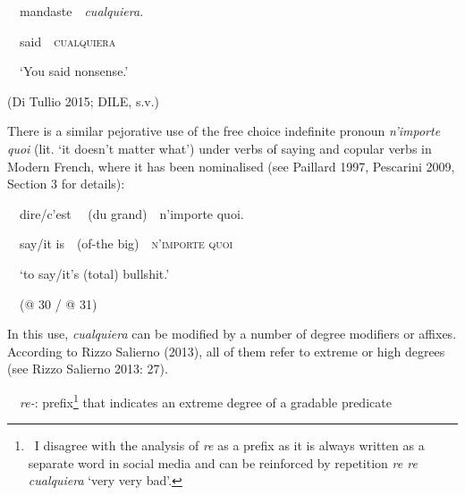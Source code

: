 \begin{styleStandard}
\ \ mandaste\ \ \textit{cualquiera}.\ \ 
\end{styleStandard}

\begin{styleStandard}
\ \ said\ \ \textsc{cualquiera}\ \ 
\end{styleStandard}

\begin{styleStandard}
\ \ ‘You said nonsense.’
\end{styleStandard}

\begin{styleStandard}
(Di Tullio 2015; DILE, s.v.)
\end{styleStandard}

\begin{styleStandard}
There is a similar pejorative use of the free choice indefinite pronoun \textit{n’importe quoi }(lit. ‘it doesn’t matter what’)\textit{ }under verbs of saying and copular verbs in Modern French, where it has been nominalised (see Paillard 1997, Pescarini 2009, Section 3 for details):
\end{styleStandard}

\begin{styleStandard}
\ \ dire/c’est \ \ (du grand)\ \ n’importe quoi.
\end{styleStandard}

\begin{styleStandard}
\ \ say/it is\ \ (of-the big)\ \ \textsc{n’importe quoi}
\end{styleStandard}

\begin{styleStandard}
\ \ ‘to say/it’s (total) bullshit.’
\end{styleStandard}

\begin{styleStandard}
\ \ (@ 30 / @ 31)
\end{styleStandard}

\begin{styleStandard}
In this use, \textit{cualquiera} can be modified by a number of degree modifiers or affixes. According to Rizzo Salierno (2013), all of them refer to extreme or high degrees (see Rizzo Salierno 2013: 27).
\end{styleStandard}

\begin{styleStandard}
\ \ \textit{re-}: prefix\footnote{\ \textrm{I disagree with the analysis of }\textrm{\textit{re}}\textrm{ as a prefix as it is always written as a separate word in social media and can be reinforced by repetition }\textrm{\textit{re re cualquiera}}\textrm{ ‘very very bad’.} } that indicates an extreme degree of a gradable predicate 
\end{styleStandard}

